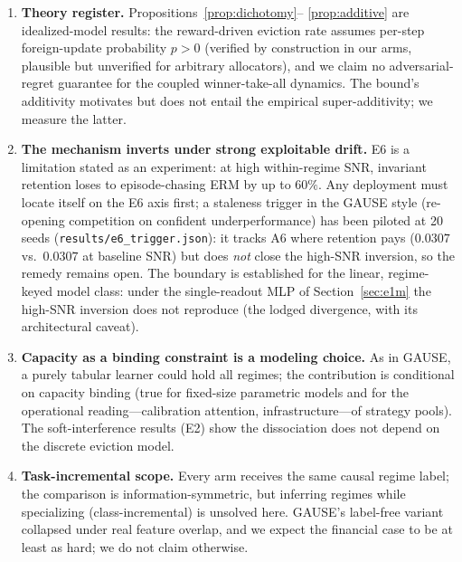 \documentclass{article}
\begin{document}
\begin{enumerate}
    enlarge the environment set but introduce their own dependence; we
    flag both rather than resolve them.
    \item \textbf{Theory register.} Propositions~\ref{prop:dichotomy}--%
    \ref{prop:additive} are idealized-model results: the reward-driven
    eviction rate assumes per-step foreign-update probability $p > 0$
    (verified by construction in our arms, plausible but unverified for
    arbitrary allocators), and we claim no adversarial-regret guarantee
    for the coupled winner-take-all dynamics. The bound's additivity
    motivates but does not entail the empirical super-additivity; we
    measure the latter.
    \item \textbf{The mechanism inverts under strong exploitable drift.}
    E6 is a limitation stated as an experiment: at high within-regime SNR,
    invariant retention loses to episode-chasing ERM by up to $60\%$. Any
    deployment must locate itself on the E6 axis first; a staleness
    trigger in the GAUSE style (re-opening competition on confident
    underperformance) has been piloted at 20 seeds
    (\texttt{results/e6\_trigger.json}): it tracks A6 where retention
    pays ($0.0307$ vs.\ $0.0307$ at baseline SNR) but does \emph{not}
    close the high-SNR inversion, so the remedy remains open. The
    boundary is established for the linear, regime-keyed model class:
    under the single-readout MLP of Section~\ref{sec:e1m} the
    high-SNR inversion does not reproduce (the lodged divergence,
    with its architectural caveat).
    \item \textbf{Capacity as a binding constraint is a modeling choice.}
    As in GAUSE, a purely tabular learner could hold all regimes; the
    contribution is conditional on capacity binding (true for fixed-size
    parametric models and for the operational reading---calibration
    attention, infrastructure---of strategy pools). The soft-interference
    results (E2) show the dissociation does not depend on the discrete
    eviction model.
    \item \textbf{Task-incremental scope.} Every arm receives the same
    causal regime label; the comparison is information-symmetric, but
    inferring regimes while specializing (class-incremental) is unsolved
    here. GAUSE's label-free variant collapsed under real feature overlap,
    and we expect the financial case to be at least as hard; we do not
    claim otherwise.
\end{enumerate}

\end{document}
